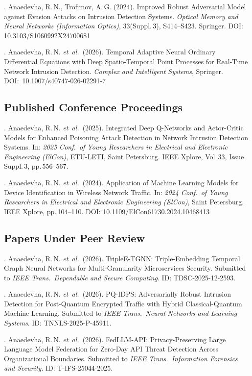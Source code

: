 . Anaedevha, R.\,N., Trofimov, A.\,G. (2024). Improved Robust Adversarial Model against Evasion Attacks on Intrusion Detection Systems. \textit{Optical Memory and Neural Networks (Information Optics)}, 33(Suppl.\,3), S414--S423. Springer. DOI: 10.3103/S1060992X24700681

. Anaedevha, R.\,N. \textit{et~al.}\ (2026). Temporal Adaptive Neural Ordinary Differential Equations with Deep Spatio-Temporal Point Processes for Real-Time Network Intrusion Detection. \textit{Complex and Intelligent Systems}, Springer. DOI:~10.1007/s40747-026-02291-7

\subsection*{Published Conference Proceedings}

. Anaedevha, R.\,N. \textit{et~al.}\ (2025). Integrated Deep Q-Networks and Actor-Critic Models for Enhanced Poisoning Attack Detection in Network Intrusion Detection Systems. In: \textit{2025 Conf.\ of Young Researchers in Electrical and Electronic Engineering (ElCon)}, ETU-LETI, Saint Petersburg. IEEE Xplore, Vol.\,33, Issue Suppl.\,3, pp.\,556--567.

. Anaedevha, R.\,N. \textit{et~al.}\ (2024). Application of Machine Learning Models for Device Identification in Wireless Network Traffic. In: \textit{2024 Conf.\ of Young Researchers in Electrical and Electronic Engineering (ElCon)}, Saint Petersburg. IEEE Xplore, pp.\,104--110. DOI: 10.1109/ElCon61730.2024.10468413

\subsection*{Papers Under Peer Review}

. Anaedevha, R.\,N. \textit{et~al.}\ (2026). TripleE-TGNN: Triple-Embedding Temporal Graph Neural Networks for Multi-Granularity Microservices Security. Submitted to \textit{IEEE Trans.\ Dependable and Secure Computing}. ID: TDSC-2025-12-2593.

. Anaedevha, R.\,N. \textit{et~al.}\ (2026). PQ-IDPS: Adversarially Robust Intrusion Detection for Post-Quantum Encrypted Traffic with Hybrid Classical-Quantum Machine Learning. Submitted to \textit{IEEE Trans.\ Neural Networks and Learning Systems}. ID: TNNLS-2025-P-45911.

. Anaedevha, R.\,N. \textit{et~al.}\ (2026). FedLLM-API: Privacy-Preserving Large Language Model Federation for Zero-Day API Threat Detection Across Organizational Boundaries. Submitted to \textit{IEEE Trans.\ Information Forensics and Security}. ID: T-IFS-25044-2025.

